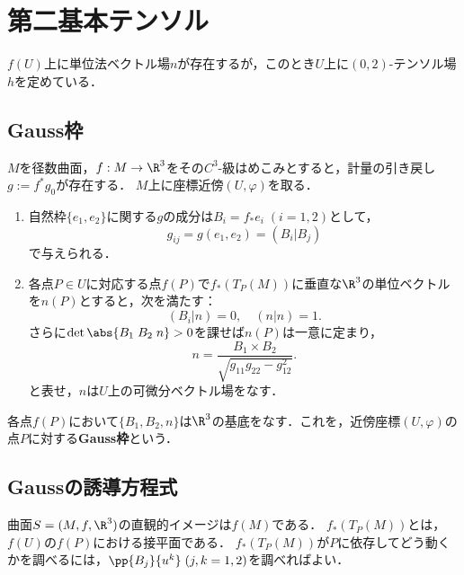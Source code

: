 \documentclass[uplatex,dvipdfmx]{jsreport}
\begin{document}
\section{第二基本テンソル}

\begin{tcolorbox}[colframe=ForestGreen, colback=ForestGreen!10!white,breakable,colbacktitle=ForestGreen!40!white,coltitle=black,fonttitle=\bfseries\sffamily,
title=]
    $f(U)$上に単位法ベクトル場$n$が存在するが，このとき$U$上に$(0,2)$-テンソル場$h$を定めている．
\end{tcolorbox}

\subsection{Gauss枠}

\begin{observation}
    $M$を径数曲面，$f:M\to\R^3$をその$C^3$-級はめこみとすると，計量の引き戻し$g:=f^*g_0$が存在する．
    $M$上に座標近傍$(U,\varphi)$を取る．
    \begin{enumerate}
        \item 自然枠$\{e_1,e_2\}$に関する$g$の成分は$B_i=f_*e_i\;(i=1,2)$として，
        \[g_{ij}=g(e_1,e_2)=(B_i|B_j)\]
        で与えられる．
        \item 各点$P\in U$に対応する点$f(P)$で$f_*(T_P(M))$に垂直な$\R^3$の単位ベクトルを$n(P)$とすると，次を満たす：
        \[(B_i|n)=0,\quad(n|n)=1.\]
        さらに$\det\abs{B_1\;B_2\;n}>0$を課せば$n(P)$は一意に定まり，
        \[n=\frac{B_1\times B_2}{\sqrt{g_{11}g_{22}-g_{12}^2}}.\]
        と表せ，$n$は$U$上の可微分ベクトル場をなす．
    \end{enumerate}
\end{observation}

\begin{definition}
    各点$f(P)$において$\{B_1,B_2,n\}$は$\R^3$の基底をなす．これを，近傍座標$(U,\varphi)$の点$P$に対する\textbf{Gauss枠}という．
\end{definition}

\subsection{Gaussの誘導方程式}

\begin{remarks}
    曲面$S=(M,f,\R^3)$の直観的イメージは$f(M)$である．
    $f_*(T_P(M))$とは，$f(U)$の$f(P)$における接平面である．
    $f_*(T_P(M))$が$P$に依存してどう動くかを調べるには，$\pp{B_j}{u^k}\;(j,k=1,2)$を調べればよい．
\end{remarks}
\end{document}
